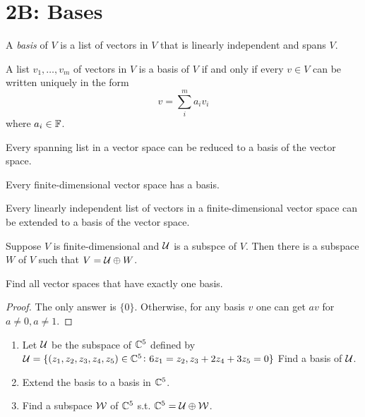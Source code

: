 \documentclass{extarticle}
\begin{document}
\section*{2B: Bases}

\begin{definition}[basis]
    A \emph{basis} of \(V\) is a list of vectors in \(V\) that is linearly 
    independent and spans \(V\).
\end{definition}

\begin{thm}
    A list \(v_1, \ldots, v_m\) of vectors in \(V\) is a basis of \(V\)
    if and only if every \(v \in V\) can be written uniquely in the form 
    \[v = \sum_i^m a_i v_i\]
    where \(a_i \in \mathbb{F}\).
\end{thm}

\begin{lemma}
    Every spanning list in a vector space can be reduced to a basis of the 
    vector space.
\end{lemma}

\begin{lemma}
    Every finite-dimensional vector space has a basis.
\end{lemma}

\begin{lemma}
    Every linearly independent list of vectors in a finite-dimensional vector 
    space can be extended to a basis of the vector space. 
\end{lemma}

\begin{lemma}
    Suppose \(V\) is finite-dimensional and \(\mathcal{U}\) is a subspce of \(V\). 
    Then there is a subspace \(W\) of \(V\) such that \(V = \mathcal{U} \oplus W\).
\end{lemma}

\newpage 
{}

\begin{problem}{1}
    Find all vector spaces that have exactly one basis.
\end{problem}

\begin{proof}
The only answer is \(\{0\}\). Otherwise, for any basis \(v\) one can get 
\(av\) for \(a \neq 0, a \neq 1\).
\end{proof}

\begin{problem}{4}
    \begin{enumerate}
        \item Let \(\mathcal{U}\) be the subspace of \(\mathbb{C}^5\) defined by 
        \(\mathcal{U} = \{(z_1, z_2, z_3, z_4, z_5) \in \mathbb{C}^5 \colon 6z_1 = z_2
        , z_3 + 2z_4 + 3z_5 = 0\}\)
        Find a basis of \(\mathcal{U}\).
        \item Extend the basis to a basis in \(\mathbb{C}^5\).
        \item Find a subspace \(\mathcal{W}\) of \(\mathbb{C}^5\) s.t. \(\mathbb{C}^5 = \mathcal{U} \oplus \mathcal{W}\).
    \end{enumerate}
\end{problem}
\end{document}
